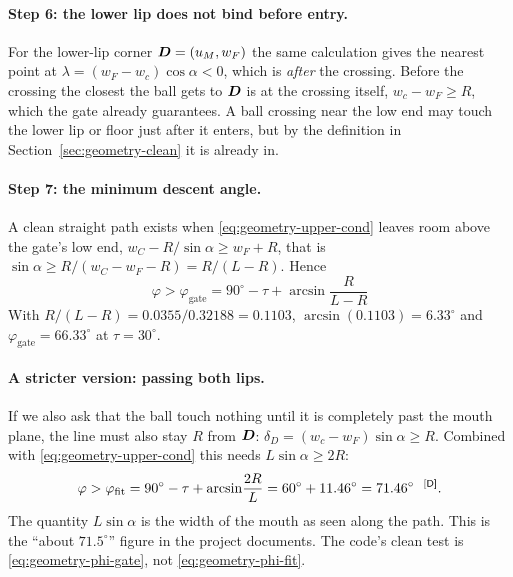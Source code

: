 \paragraph{Step 6: the lower lip does not bind before entry.} For the lower-lip corner
$\bm{D} = (u_M, w_F)$ the same calculation gives the nearest point at
$\lambda = (w_F - w_c)\cos\alpha < 0$, which is \emph{after} the crossing. Before the crossing the
closest the ball gets to $\bm{D}$ is at the crossing itself, $w_c - w_F \ge R$, which the gate
already guarantees. A ball crossing near the low end may touch the lower lip or floor just after it
enters, but by the definition in Section~\ref{sec:geometry-clean} it is already in.

\paragraph{Step 7: the minimum descent angle.} A clean straight path exists when
\eqref{eq:geometry-upper-cond} leaves room above the gate's low end, $w_C - R/\sin\alpha \ge w_F + R$, that is
$\sin\alpha \ge R/(w_C - w_F - R) = R/(L - R)$. Hence
\begin{equation}
  \boxed{\;\varphi > \varphi_{\mathrm{gate}} = 90^\circ - \tau + \arcsin\!\frac{R}{L - R}\;}
  \label{eq:geometry-phi-gate}
\end{equation}
With $R/(L-R) = 0.0355/0.32188 = 0.1103$\derived, $\arcsin(0.1103) = 6.33^\circ$\derived{} and
$\varphi_{\mathrm{gate}} = 66.33^\circ$\derived{} at $\tau = 30^\circ$\confirmed.

\paragraph{A stricter version: passing both lips.} If we also ask that the ball touch nothing until it
is completely past the mouth plane, the line must also stay $R$ from $\bm{D}$:
$\delta_D = (w_c - w_F)\sin\alpha \ge R$. Combined with \eqref{eq:geometry-upper-cond} this needs
$L\sin\alpha \ge 2R$:
\begin{equation}
  \varphi > \varphi_{\mathrm{fit}} = 90^\circ - \tau + \arcsin\!\frac{2R}{L}
  = 60^\circ + 11.46^\circ = 71.46^\circ\text{\derived}.
  \label{eq:geometry-phi-fit}
\end{equation}
The quantity $L\sin\alpha$ is the width of the mouth as seen along the path. This is the
``about $71.5^\circ$'' figure in the project documents. The code's clean test is
\eqref{eq:geometry-phi-gate}, not \eqref{eq:geometry-phi-fit}.


